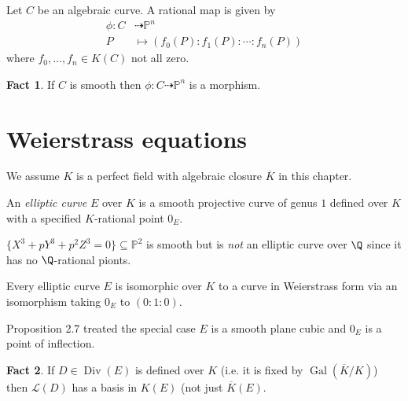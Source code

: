 \documentclass[a4paper]{article}
\theoremstyle{definition}
\newtheorem*{fact}{Fact}
\theoremstyle{theorem}
\renewcommand*{\P}{\mathbb{P}}
\DeclareMathOperator{\Div}{Div} %
\newcommand{\rational}{\dashrightarrow} %
\begin{document}
\begin{remark}
  Let \(C\) be an algebraic curve. A rational map is given by
  \begin{align*}
    \phi: C &\rational \P^n \\
    P &\mapsto (f_0(P) : f_1(P) : \cdots : f_n(P))
  \end{align*}
  where \(f_0, \dots, f_n \in K(C)\) not all zero.
\end{remark}

\begin{fact}
  If \(C\) is smooth then \(\phi: C \rational \P^n\) is a morphism.
\end{fact}

\section{Weierstrass equations}

We assume \(K\) is a perfect field with algebraic closure \(\overline K\) in this chapter.

\begin{definition}
  An \emph{elliptic curve} \(E\) over \(K\) is a smooth projective curve of genus \(1\) defined over \(K\) with a specified \(K\)-rational point \(0_E\).
\end{definition}

\begin{eg}
  \(\{X^3 + pY^3 + p^2Z^3 = 0\} \subseteq \P^2\) is smooth but is \emph{not} an elliptic curve over \(\Q\) since it has no \(\Q\)-rational pionts.
\end{eg}

\begin{theorem}
  Every elliptic curve \(E\) is isomorphic over \(K\) to a curve in Weierstrass form via an isomorphism taking \(0_E\) to \((0 : 1 : 0)\).
\end{theorem}

\begin{remark}
  Proposition 2.7 treated the special case \(E\) is a smooth plane cubic and \(0_E\) is a point of inflection.
\end{remark}

\begin{fact}
  If \(D \in \Div(E)\) is defined over \(K\) (i.e. it is fixed by \(\operatorname{Gal}(\overline K/K)\)) then \(\mathcal L(D)\) has a basis in \(K(E)\) (not just \(\overline K(E)\).
\end{fact}
\end{document}
